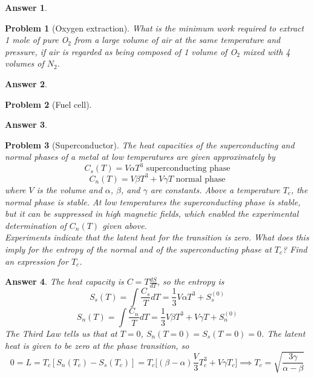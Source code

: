 \documentclass[a4paper]{article}
\newtheorem{ans}{Answer}[section]
\theoremstyle{new}
\newtheorem{qns}{Problem}[section]
\begin{document}
\begin{ans}

\end{ans}
\begin{qns}[Oxygen extraction]
What is the minimum work required to extract 1 mole of pure O$_2$ from a large volume of air at the same temperature and pressure, if air is regarded as being composed of 1 volume of O$_2$ mixed with 4 volumes of $N_2$. 
\end{qns}
\begin{ans}

\end{ans}
\newpage
\begin{qns}[Fuel cell]

\end{qns}
\begin{ans}

\end{ans}
\begin{qns}[Superconductor]
The heat capacities of the superconducting and normal phases of a metal at low temperatures are given approximately by
$$C_s(T)=V\alpha T^3\text{ superconducting phase}$$
$$C_n(T)=V\beta T^3+V\gamma T\text{ normal phase}$$
where $V$ is the volume and $\alpha$, $\beta$, and $\gamma$ are constants. Above a temperature $T_c$, the normal phase is stable. At low temperatures the superconducting phase is stable, but it can be suppressed in high magnetic fields, which enabled the experimental determination of $C_n(T)$ given above.\\[5pt]
Experiments indicate that the latent heat for the transition is zero. What does this imply for the entropy of the normal and of the superconducting phase at $T_c$? Find an expression for $T_c$.
\end{qns}
\begin{ans}
The heat capacity is $C=T\frac{dS}{dT}$, so the entropy is
$$S_{s}(T)=\int\frac{C_{s}}{T}dT=\frac{1}{3}V\alpha T^3+S^{(0)}_{s}$$
$$S_{n}(T)=\int\frac{C_{n}}{T}dT=\frac{1}{3}V\beta T^3+V\gamma T+S^{(0)}_{n}$$
The Third Law tells us that at $T=0$, $S_n(T=0)=S_s(T=0)=0$. The latent heat is given to be zero at the phase transition, so
$$0=L=T_c[S_n(T_c)-S_s(T_c)]=T_c\bigg[(\beta-\alpha)\frac{V}{3}T_c^3+V\gamma T_c\bigg]\implies T_c=\sqrt{\frac{3\gamma}{\alpha-\beta}}$$
\end{ans}
\newpage
\end{document}
